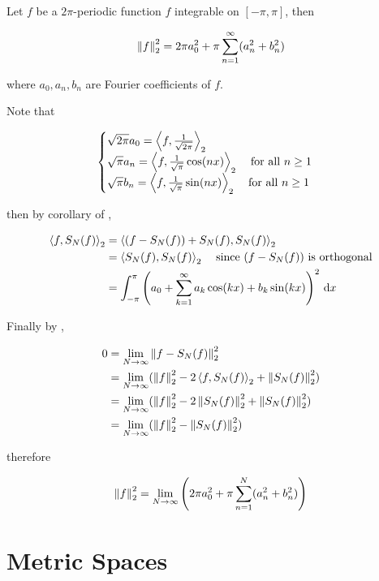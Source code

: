 \documentclass[a4paper,12pt]{article}
\begin{document}
\begin{pst}
  Let $f$ be a $2\pi$-periodic function $f$ integrable on $[-\pi,\pi]$, then

  $$\left\| f\right\|_{2}^{2}=2\pi a_{0}^{2}+\pi\sum_{n=1}^{\infty}(a_{n}^{2}+b_{n}^{2})$$\s

  where $a_{0},a_{n},b_{n}$ are Fourier coefficients of $f$.\n

  \prf Note that

  $$\begin{cases}
    \sqrt{2\pi}a_{0}=\left\langle f,\frac{1}{\sqrt{2\pi}}\right\rangle_{2}\\
    \sqrt{\pi}a_{n}=\left\langle f,\frac{1}{\sqrt{\pi}}\cos(nx)\right\rangle_{2}\;\;\;\;\text{for all }n\geq 1\\
    \sqrt{\pi}b_{n}=\left\langle f,\frac{1}{\sqrt{\pi}}\sin(nx)\right\rangle_{2}\;\;\;\;\text{for all }n\geq 1
  \end{cases}$$\s

  then by corollary of \rpst[\sctr{2}],

  $$\begin{aligned}[t]
    \left\langle f,S_{N}(f)\right\rangle_{2}&=\left\langle (f-S_{N}(f))+S_{N}(f),S_{N}(f)\right\rangle_{2}\\
    &=\left\langle S_{N}(f),S_{N}(f)\right\rangle_{2}\;\;\;\;\text{since }(f-S_{N}(f))\text{ is orthogonal}\\
    &=\int_{-\pi}^{\pi}\left( a_{0}+\sum_{k=1}^{\infty}a_{k}\cos(kx)+b_{k}\sin(kx)\right)^{2}\,\mathrm{d} x
  \end{aligned}$$\s

  Finally by \rthm[\sctr{1}],

  $$\begin{aligned}[t]
    0&=\lim_{N\to\infty}\left\| f-S_{N}(f)\right\|_{2}^{2}\\
    &=\lim_{N\to\infty}(\left\| f\right\|_{2}^{2}-2\left\langle f,S_{N}(f)\right\rangle_{2}+\left\| S_{N}(f)\right\|_{2}^{2})\\
    &=\lim_{N\to\infty}(\left\| f\right\|_{2}^{2}-2\left\| S_{N}(f)\right\|_{2}^{2}+\left\| S_{N}(f)\right\|_{2}^{2})\\
    &=\lim_{N\to\infty}(\left\| f\right\|_{2}^{2}-\left\| S_{N}(f)\right\|_{2}^{2})
  \end{aligned}$$\s

  therefore

  $$\left\| f\right\|_{2}^{2}=\lim_{N\to\infty}\left( 2\pi a_{0}^{2}+\pi\sum_{n=1}^{N}(a_{n}^{2}+b_{n}^{2})\right)$$
\end{pst}

\pagebreak

\section{Metric Spaces}
\end{document}
